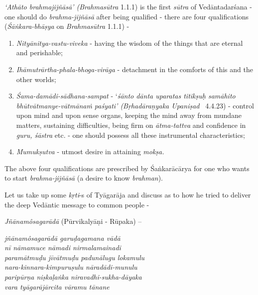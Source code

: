 \textit{‘Athāto brahmajijñāsā' (Brahmasūtra} 1.1.1) is the first \textit{sūtra} of Vedāntadarśana - one should do \textit{brahma-jijñāsā} after being qualified - there are four qualifications (\textit{Śāṅkara-bhāṣya} on \textit{Brahmasūtra} 1.1.1) -

\vspace{-.3cm}

\begin{enumerate}
\itemsep=0pt

 \item \textit{Nityānitya-vastu-viveka} - having the wisdom of the things that are eternal and perishable;

 \item \textit{Ihāmutrārtha-phala-bhoga-virāga} - detachment in the comforts of this and the other worlds;

 \item \textit{Śama-damādi-sādhana-sampat} - ‘\textit{śānto dānta uparatas titikṣuḥ samāhito bhūtvātmanye-vātmānaṁ paśyati’ (Bṛhadāraṇyaka Upaniṣad}  4.4.23) - control upon mind and upon sense organs, keeping the mind away from mundane matters, sustaining difficulties, being firm on \textit{ātma-tattva} and confidence in \textit{guru, śāstra} etc. - one should possess all these instrumental characteristics;

 \item \textit{Mumukṣutva} - utmost desire in attaining \textit{mokṣa.}

\end{enumerate}

The above four qualifications are prescribed by Śaṅkarācārya for one who wants to start \textit{brahma-jijñāsā} (a desire to know \textit{brahman}).

Let us take up some \textit{kṛti}-s of Tyāgarāja and discuss as to how he tried to deliver the deep Vedāntic message to common people -

\textit{Jñānamôsagarādā} (Pūrvikalyāṇi - Rūpaka) –

\begin{centerquote}
\textit{jñānamôsagarādā garuḍagamana vādā} \\ \textit{nī nāmamuce nāmadi nirmalamainadi} \\ \textit{paramātmuḍu jīvātmuḍu padunālugu lokamulu}\\ \textit{nara-kinnara-kimpuruṣulu nāradādi-munulu}\\ \textit{paripūrṇa niṣkaḷaṅka niravadhi-sukha-dāyaka}\\ \textit{vara tyāgarājārcita vāramu tānane}
\end{centerquote}

